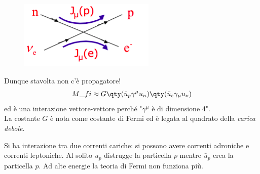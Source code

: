 \begin{minipage}{0.3\textwidth}
    \begin{figure}[H]
        \centering
        \includegraphics[width=\textwidth]{immagini/fig_diag_weak_int_fermi.png}
    \end{figure}
\end{minipage}
\begin{minipage}{0.65\textwidth}
    Dunque stavolta non c'è propagatore!\\
    \begin{equation*}
    M\_{fi}\approx G\qty(\bar u_p\gamma^\mu u_n)\qty(\bar{u}_e\gamma_\mu u_\nu)
    \end{equation*}
    ed è una interazione vettore-vettore perché "$\gamma^\mu$ è di dimensione 4". \\
    La costante $G$ è nota come costante di Fermi ed è legata al quadrato della \textit{carica debole}.
\end{minipage}
Si ha interazione tra due correnti cariche: si possono avere correnti adroniche e correnti leptoniche. Al solito $u_p$ distrugge la particella $p$ mentre $\bar{u}_p$ crea la particella $p$. Ad alte energie la teoria di Fermi non funziona più.
